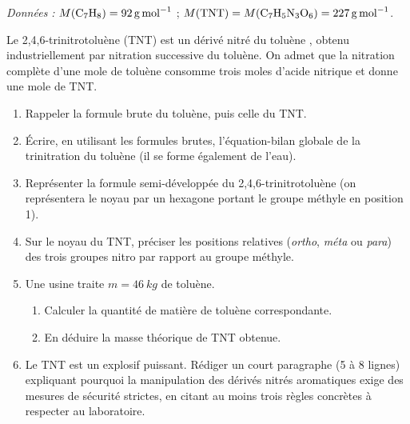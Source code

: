 \documentclass[11pt]{article}
\begin{document}
\begin{exercice}
\emph{Données :} $M(\ce{C7H8}) = \SI{92}{g.mol^{-1}}$ ; $M(\ce{TNT}) = M(\ce{C7H5N3O6}) = \SI{227}{g.mol^{-1}}$.

Le 2,4,6-trinitrotoluène (TNT) est un dérivé nitré du toluène , obtenu industriellement par nitration successive du toluène. On admet que la nitration complète d'une mole de toluène consomme trois moles d'acide nitrique et donne une mole de TNT.
\begin{enumerate}
\item Rappeler la formule brute du toluène, puis celle du TNT.
\item Écrire, en utilisant les formules brutes, l'équation-bilan globale de la trinitration du toluène (il se forme également de l'eau).
\item Représenter la formule semi-développée du 2,4,6-trinitrotoluène (on représentera le noyau par un hexagone portant le groupe méthyle en position 1).
\item Sur le noyau du TNT, préciser les positions relatives (\emph{ortho}, \emph{méta} ou \emph{para}) des trois groupes nitro par rapport au groupe méthyle.
\item Une usine traite $m = \SI{46}{kg}$ de toluène.
\begin{enumerate}
\item Calculer la quantité de matière de toluène correspondante.
\item En déduire la masse théorique de TNT obtenue.
\end{enumerate}
\item Le TNT est un explosif puissant. Rédiger un court paragraphe (5 à 8 lignes) expliquant pourquoi la manipulation des dérivés nitrés aromatiques exige des mesures de sécurité strictes, en citant au moins trois règles concrètes à respecter au laboratoire.
\end{enumerate}
\end{exercice}
\end{document}
